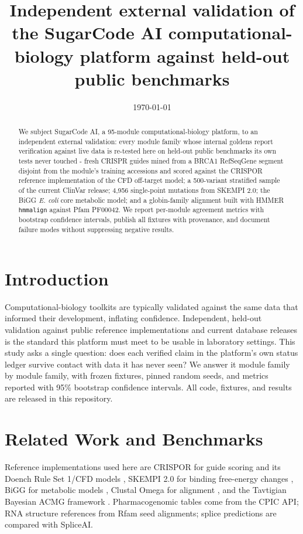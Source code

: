 \documentclass[11pt]{article}
\title{Independent external validation of the SugarCode AI computational-biology platform against held-out public benchmarks}
\author{}
\date{\today}
\begin{document}
\maketitle
\begin{abstract}
We subject SugarCode AI, a 95-module computational-biology platform, to an
independent external validation: every module family whose internal goldens
report verification against live data is re-tested here on held-out public
benchmarks its own tests never touched - fresh CRISPR guides mined from a
BRCA1 RefSeqGene segment disjoint from the module's training accessions and
scored against the CRISPOR reference implementation of the CFD off-target
model; a 500-variant stratified sample of the current ClinVar release; 4{,}956
single-point mutations from SKEMPI 2.0; the BiGG \emph{E. coli} core
metabolic model; and a globin-family alignment built with HMMER \texttt{hmmalign} against Pfam PF00042.
We report per-module agreement metrics with bootstrap confidence intervals,
publish all fixtures with provenance, and document failure modes without
suppressing negative results.
\end{abstract}
\section{Introduction}
Computational-biology toolkits are typically validated against the same data
that informed their development, inflating confidence. Independent, held-out
validation against public reference implementations and current database
releases is the standard this platform must meet to be usable in laboratory
settings. This study asks a single question: does each verified claim in the
platform's own status ledger survive contact with data it has never seen?
We answer it module family by module family, with frozen fixtures, pinned
random seeds, and metrics reported with 95\% bootstrap confidence intervals.
All code, fixtures, and results are released in this repository.
\section{Related Work and Benchmarks}
Reference implementations used here are CRISPOR for guide scoring \cite{crispor} and its Doench Rule Set 1/CFD models \cite{doench2016}, SKEMPI 2.0 for binding free-energy changes \cite{skempi}, BiGG for metabolic models \cite{bigg}, Clustal Omega for alignment \cite{clustalo}, and the Tavtigian Bayesian ACMG framework \cite{tavtigian}. Pharmacogenomic tables come from the CPIC API; RNA structure references from Rfam seed alignments; splice predictions are compared with SpliceAI.
\end{document}
